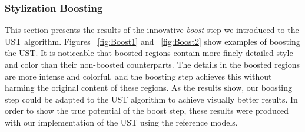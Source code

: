 \subsubsection{Stylization Boosting}
This section presents the results of the innovative \textit{boost} step we introduced to the UST algorithm. Figures ~\ref{fig:Boost1} and ~\ref{fig:Boost2} show examples of boosting the UST. It is noticeable that boosted regions contain more finely detailed style and color than their non-boosted counterparts. The details in the boosted regions are more intense and colorful, and the boosting step achieves this without harming the original content of these regions. As the results show, our boosting step could be adapted to the UST algorithm to achieve visually better results. In order to show the true potential of the boost step, these results were produced with our implementation of the UST using the reference models.

